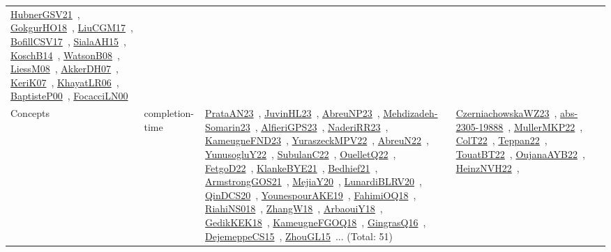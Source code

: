 {\begin{longtable}{lp{3cm}>{\raggedright\arraybackslash}p{6cm}>{\raggedright\arraybackslash}p{6cm}>{\raggedright\arraybackslash}p{8cm}}
\href{works/HubnerGSV21.pdf}{HubnerGSV21}~\cite{HubnerGSV21}, \href{works/GokgurHO18.pdf}{GokgurHO18}~\cite{GokgurHO18}, \href{works/LiuCGM17.pdf}{LiuCGM17}~\cite{LiuCGM17}, \href{works/BofillCSV17.pdf}{BofillCSV17}~\cite{BofillCSV17}, \href{works/SialaAH15.pdf}{SialaAH15}~\cite{SialaAH15}, \href{works/KoschB14.pdf}{KoschB14}~\cite{KoschB14}, \href{works/WatsonB08.pdf}{WatsonB08}~\cite{WatsonB08}, \href{works/LiessM08.pdf}{LiessM08}~\cite{LiessM08}, \href{works/AkkerDH07.pdf}{AkkerDH07}~\cite{AkkerDH07}, \href{works/KeriK07.pdf}{KeriK07}~\cite{KeriK07}, \href{works/KhayatLR06.pdf}{KhayatLR06}~\cite{KhayatLR06}, \href{works/BaptisteP00.pdf}{BaptisteP00}~\cite{BaptisteP00}, \href{works/FocacciLN00.pdf}{FocacciLN00}~\cite{FocacciLN00}\\
Concepts & completion-time & \href{works/PrataAN23.pdf}{PrataAN23}~\cite{PrataAN23}, \href{works/JuvinHL23.pdf}{JuvinHL23}~\cite{JuvinHL23}, \href{works/AbreuNP23.pdf}{AbreuNP23}~\cite{AbreuNP23}, \href{works/Mehdizadeh-Somarin23.pdf}{Mehdizadeh-Somarin23}~\cite{Mehdizadeh-Somarin23}, \href{works/AlfieriGPS23.pdf}{AlfieriGPS23}~\cite{AlfieriGPS23}, \href{works/NaderiRR23.pdf}{NaderiRR23}~\cite{NaderiRR23}, \href{works/KameugneFND23.pdf}{KameugneFND23}~\cite{KameugneFND23}, \href{works/YuraszeckMPV22.pdf}{YuraszeckMPV22}~\cite{YuraszeckMPV22}, \href{works/AbreuN22.pdf}{AbreuN22}~\cite{AbreuN22}, \href{works/YunusogluY22.pdf}{YunusogluY22}~\cite{YunusogluY22}, \href{works/SubulanC22.pdf}{SubulanC22}~\cite{SubulanC22}, \href{works/OuelletQ22.pdf}{OuelletQ22}~\cite{OuelletQ22}, \href{works/FetgoD22.pdf}{FetgoD22}~\cite{FetgoD22}, \href{works/KlankeBYE21.pdf}{KlankeBYE21}~\cite{KlankeBYE21}, \href{works/Bedhief21.pdf}{Bedhief21}~\cite{Bedhief21}, \href{works/ArmstrongGOS21.pdf}{ArmstrongGOS21}~\cite{ArmstrongGOS21}, \href{works/MejiaY20.pdf}{MejiaY20}~\cite{MejiaY20}, \href{works/LunardiBLRV20.pdf}{LunardiBLRV20}~\cite{LunardiBLRV20}, \href{works/QinDCS20.pdf}{QinDCS20}~\cite{QinDCS20}, \href{works/YounespourAKE19.pdf}{YounespourAKE19}~\cite{YounespourAKE19}, \href{works/FahimiOQ18.pdf}{FahimiOQ18}~\cite{FahimiOQ18}, \href{works/RiahiNS018.pdf}{RiahiNS018}~\cite{RiahiNS018}, \href{works/ZhangW18.pdf}{ZhangW18}~\cite{ZhangW18}, \href{works/ArbaouiY18.pdf}{ArbaouiY18}~\cite{ArbaouiY18}, \href{works/GedikKEK18.pdf}{GedikKEK18}~\cite{GedikKEK18}, \href{works/KameugneFGOQ18.pdf}{KameugneFGOQ18}~\cite{KameugneFGOQ18}, \href{works/GingrasQ16.pdf}{GingrasQ16}~\cite{GingrasQ16}, \href{works/DejemeppeCS15.pdf}{DejemeppeCS15}~\cite{DejemeppeCS15}, \href{works/ZhouGL15.pdf}{ZhouGL15}~\cite{ZhouGL15}... (Total: 51) & \href{works/CzerniachowskaWZ23.pdf}{CzerniachowskaWZ23}~\cite{CzerniachowskaWZ23}, \href{works/abs-2305-19888.pdf}{abs-2305-19888}~\cite{abs-2305-19888}, \href{works/MullerMKP22.pdf}{MullerMKP22}~\cite{MullerMKP22}, \href{works/ColT22.pdf}{ColT22}~\cite{ColT22}, \href{works/Teppan22.pdf}{Teppan22}~\cite{Teppan22}, \href{works/TouatBT22.pdf}{TouatBT22}~\cite{TouatBT22}, \href{works/OujanaAYB22.pdf}{OujanaAYB22}~\cite{OujanaAYB22}, \href{works/HeinzNVH22.pdf}{HeinzNVH22}~\cite{HeinzNVH22}, 
\end{longtable}}
